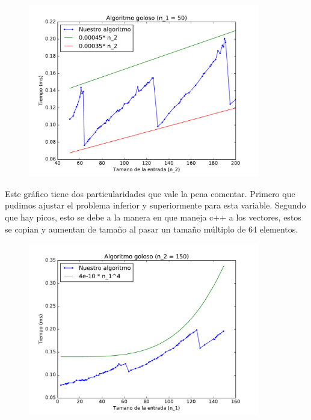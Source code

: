 \begin{figure}[H]
 \centering
	\includegraphics[width=0.9\textwidth]{graficos/problema_4/tiempos_2.pdf}
	\caption{}
	\label{fig:problema4-2}
\end{figure}

Este gráfico tiene dos particularidades que vale la pena comentar. Primero que pudimos ajustar el problema inferior y superiormente para esta variable. Segundo que hay picos, esto se debe a la manera en que maneja c++ a los vectores, estos se copian y aumentan de tamaño al pasar un tamaño múltiplo de 64 elementos.

\begin{figure}[H]
 \centering
	\includegraphics[width=0.9\textwidth]{graficos/problema_4/tiempos_3.pdf}
	\caption{}
	\label{fig:problema4-3}
\end{figure}

